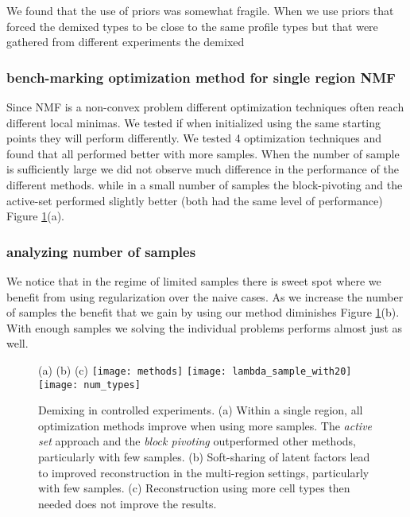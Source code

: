 
We found that the use of priors was somewhat fragile. When we use priors that forced the demixed types to be close to the same profile types but that were gathered from different experiments the demixed

\subsubsection*{bench-marking optimization method for single region NMF}

Since NMF is a non-convex problem different optimization techniques often reach different local minimas. We tested if when initialized using the same starting points they will perform differently. We tested 4 optimization techniques and found that all performed better with more samples. When the number of sample is sufficiently large we did not observe much difference in the performance of the different methods. while in a small number of samples the block-pivoting and the active-set performed slightly better (both had the same level of performance) Figure \ref{fig:controlled_exp}(a).

\subsubsection*{analyzing number of samples}
We notice that in the regime of limited samples there is sweet spot where we benefit from using regularization over the naive cases. As we increase the number of samples the benefit that we gain by using our method diminishes Figure \ref{fig:controlled_exp}(b). With enough samples we solving the individual problems performs almost just as well. 



\begin{figure}[!hbt]
   (a) \hspace{120pt}(b) \hspace{120pt}(c) \hspace{120pt}
   \centering
     \texttt{[image: methods]}
     \texttt{[image: lambda\_sample\_with20]}
     \texttt{[image: num\_types]}
    \caption{Demixing in controlled experiments. 
    (a)  Within a single region, all optimization methods improve when using more samples. The {\em active set} approach and the {\em block pivoting} outperformed other methods, particularly with few samples. (b) Soft-sharing of latent factors lead to improved reconstruction in the multi-region settings, particularly with few samples. (c) Reconstruction using more cell types then needed does not improve the results.} 
    \label{fig:controlled_exp}
\end{figure}

